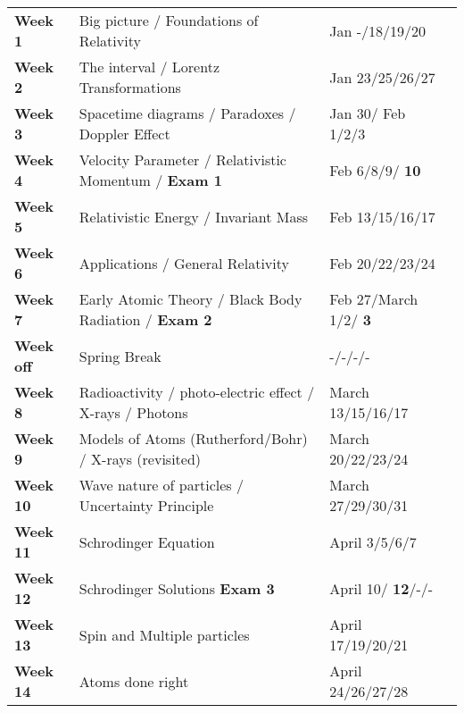 \documentclass[margin,line]{res}
\newcommand\inRed[1]{{\color{red}  \textbf{#1}}}
\begin{document}
\begin{resume}
\begin{tabular}{llll}
\textbf{Week 1}   & Big picture / Foundations of Relativity        & Jan -/18/19/20 & \\
\textbf{Week 2}   & The interval / Lorentz Transformations         & Jan 23/25/26/27 & \\
\textbf{Week 3}   & Spacetime diagrams / Paradoxes / Doppler Effect        & Jan 30/ Feb 1/2/3 & \\
\textbf{Week 4}   & Velocity Parameter / Relativistic Momentum / \inRed{Exam 1}    & Feb 6/8/9/\inRed{10} & \\
\textbf{Week 5}   & Relativistic Energy / Invariant Mass                  & Feb 13/15/16/17 & \\
\textbf{Week 6}   & Applications / General Relativity                     & Feb 20/22/23/24 & \\
\textbf{Week 7}   & Early Atomic Theory / Black Body Radiation / \inRed{Exam 2}       & Feb 27/March 1/2/ \inRed{3} & \\
\textbf{Week off} &  Spring Break                              & -/-/-/- & \\
\textbf{Week 8}   & Radioactivity / photo-electric effect / X-rays / Photons   & March 13/15/16/17 & \\
\textbf{Week 9}   &  Models of Atoms (Rutherford/Bohr) / X-rays (revisited)      & March 20/22/23/24 & \\
\textbf{Week 10}  &  Wave nature of particles / Uncertainty Principle                                     & March 27/29/30/31 & \\
\textbf{Week 11}  &  Schrodinger Equation                  & April 3/5/6/7 & \\
\textbf{Week 12}  &  Schrodinger Solutions  \inRed{Exam 3}           & April 10/\inRed{12}/-/- & \\
\textbf{Week 13}  &  Spin and Multiple particles                      & April 17/19/20/21 & \\
\textbf{Week 14}  &  Atoms done right                             & April 24/26/27/28 & \\
\end{tabular}

\end{resume}
\end{document}
